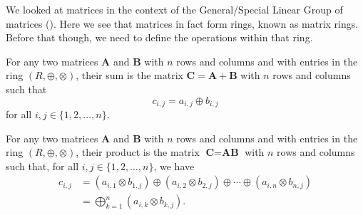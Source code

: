 We looked at matrices in the context of the General/Special Linear Group of matrices (). Here we see that matrices in fact form rings, known as matrix rings. Before that though, we need to define the operations within that ring.

\begin{definition}
    For any two matrices $\textbf{A}$ and $\textbf{B}$ with $n$ rows and columns and with entries in the ring $(R, \oplus, \otimes)$, their sum is the matrix $\textbf{C} = \textbf{A} + \textbf{B}$ with $n$ rows and columns such that
    \[
        c_{i,j} = a_{i,j} \oplus b_{i,j}
    \]
    for all $i,j \in \{1, 2, \dots, n\}$.
\end{definition}
\begin{definition}
    For any two matrices $\textbf{A}$ and $\textbf{B}$ with $n$ rows and columns and with entries in the ring $(R, \oplus, \otimes)$, their product is the matrix $\textbf{C} = \textbf{AB}$ with $n$ rows and columns such that, for all $i,j \in \{1, 2, \dots, n\}$, we have
    \begin{align*}
        c_{i,j} &= (a_{i,1}\otimes b_{1,j}) \oplus (a_{i,2}\otimes b_{2,j}) \oplus \cdots \oplus (a_{i,n}\otimes b_{n,j})\\
        &= \bigoplus_{k=1}^n (a_{i,k}\otimes b_{k,j}).
    \end{align*}
\end{definition}


